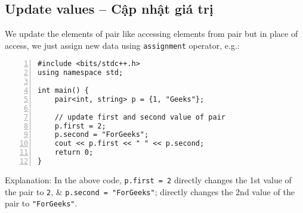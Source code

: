 \documentclass{article}
\begin{document}

\subsection{Update values -- Cập nhật giá trị}
We update the elements of pair like accessing elements from pair but in place of access, we just assign new data using {\tt assignment} operator, e.g.:
\begin{Verbatim}[numbers=left,xleftmargin=5mm]
#include <bits/stdc++.h>
using namespace std;

int main() {
    pair<int, string> p = {1, "Geeks"};
	
    // update first and second value of pair
    p.first = 2;
    p.second = "ForGeeks";
    cout << p.first << " " << p.second;
    return 0;
}
\end{Verbatim}
Explanation: In the above code, {\tt p.first = 2} directly changes the 1st value of the pair to {\tt2}, \& {\tt p.second = "ForGeeks"}; directly changes the 2nd value of the pair to {\tt"ForGeeks"}.

\end{document}
